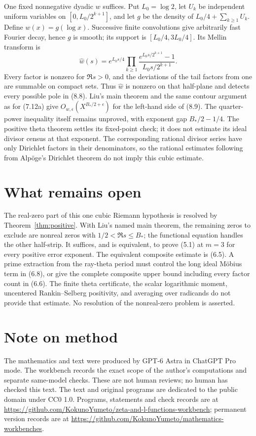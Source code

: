 \documentclass[11pt]{article}
\newcommand{\workbenchurl}{https://github.com/KokunoYumeto/zeta-and-l-functions-workbench}
\newcommand{\recordurl}{https://github.com/KokunoYumeto/mathematics-workbenches}
\begin{document}
One fixed nonnegative dyadic $w$ suffices. Put $L_0=\log2$, let $U_k$ be independent uniform variables on $[0,L_0/2^{k+1}]$, and let $g$ be the density of $L_0/4+\sum_{k\ge1}U_k$. Define $w(x)=g(\log x)$. Successive finite convolutions give arbitrarily fast Fourier decay, hence $g$ is smooth; its support is $[L_0/4,3L_0/4]$. Its Mellin transform is
\[
 \widehat w(s)=e^{L_0s/4}
       \prod_{k\ge1}\frac{e^{L_0s/2^{k+1}}-1}{L_0s/2^{k+1}}.
\]
Every factor is nonzero for $\Re s>0$, and the deviations of the tail factors from one are summable on compact sets. Thus $\widehat w$ is nonzero on that half-plane and detects every possible pole in (8.8). Liu's main theorem and the same contour argument as for (7.12a) give $O_{w,\epsilon}(X^{B_*/2+\epsilon})$ for the left-hand side of (8.9). The quarter-power inequality itself remains unproved, with exponent gap $B_*/2-1/4$. The positive theta theorem settles its fixed-point check; it does not estimate its ideal divisor census at that exponent. The corresponding rational divisor series have only Dirichlet factors in their denominators, so the rational estimates following from Alp\"oge's Dirichlet theorem do not imply this cubic estimate.

\section{What remains open}
The real-zero part of this one cubic Riemann hypothesis is resolved by Theorem~\ref{thm:positive}. With Liu's named main theorem, the remaining zeros to exclude are nonreal zeros with $1/2<\Re s\le B_*$; the functional equation handles the other half-strip. It suffices, and is equivalent, to prove (5.1) at $m=3$ for every positive error exponent. The equivalent composite estimate is (6.5). A prime extraction from the ray-theta period must control the long ideal M\"obius term in (6.8), or give the complete composite upper bound including every factor count in (6.6). The finite theta certificate, the scalar logarithmic moment, uncentered Rankin--Selberg positivity, and averaging over radicands do not provide that estimate. No resolution of the nonreal-zero problem is asserted.

\section*{Note on method}
The mathematics and text were produced by GPT-6 Astra in ChatGPT Pro mode. The workbench records the exact scope of the author's computations and separate same-model checks. These are not human reviews; no human has checked this text. The text and original programs are dedicated to the public domain under CC0 1.0. Programs, statements and check records are at \url{\workbenchurl}; permanent version records are at \url{\recordurl}.
\end{document}
